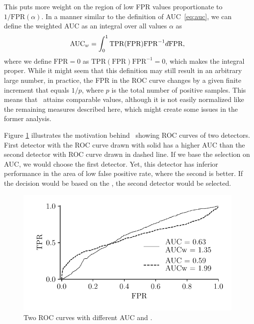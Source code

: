 This puts more weight on the region of low FPR values proportionate to $1/\text{FPR}(\alpha)$. In a manner similar to the definition of AUC~\eqref{eq:auc}, we can define the weighted AUC as an integral over all values $\alpha$ as
\begin{equation}
\textrm{AUC}_w=\int_0^1\text{TPR}(\text{FPR})\text{FPR}^{-1}d\text{FPR},
\label{eq:AUCw}
\end{equation}
where we define $\text{FPR} = 0$ as $\text{TPR}(\text{FPR})\text{FPR}^{-1} = 0$, which makes the integral proper. While it might seem that this definition may still result in an arbitrary large number, in practice, the FPR in the ROC curve changes by a given finite increment that equals $1/p$, where $p$ is the total number of positive samples. This means that \aucw~attains comparable values, although it is not easily normalized like the remaining measures described here, which might create some issues in the former analysis.

Figure \ref{fig:AUCw} illustrates the motivation behind \aucw~showing ROC curves of two detectors. First detector with the ROC curve drawn with solid has a higher AUC than the second detector with ROC curve drawn in dashed line. If we base the selection on AUC, we would choose the first detector. Yet, this detector has inferior performance in the area of low false positive rate, where the second is better. If the decision would be based on the \aucw, the second detector would be selected. 

\begin{figure}
\centering
\includegraphics[scale=0.85]{data/chapter_intro/fig_auc_weighted.pdf}
\caption{Two ROC curves with different AUC and \aucw.}
\label{fig:AUCw}
\end{figure}

